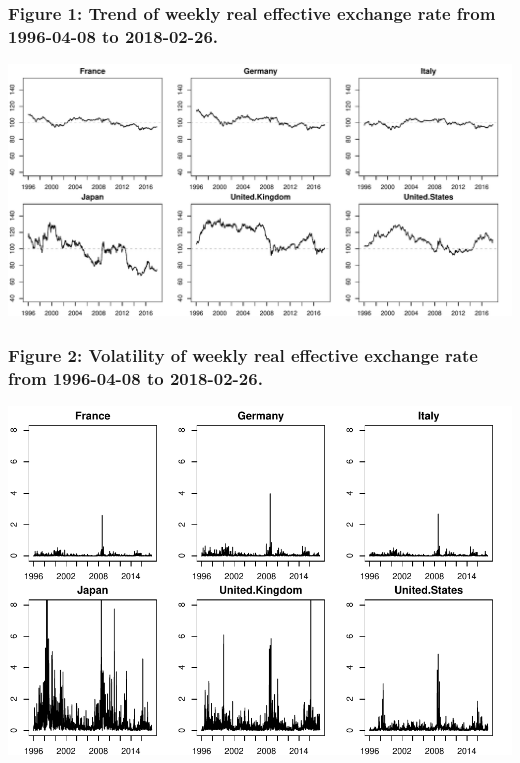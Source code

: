 \documentclass[]{elsarticle} %
\makeatletter
\def\maxwidth{\ifdim\Gin@nat@width>\linewidth\linewidth
\else\Gin@nat@width\fi}
\let\Oldincludegraphics\includegraphics
\renewcommand{\includegraphics}[1]{\Oldincludegraphics[width=\maxwidth]{#1}}
\makeatother
\begin{document}
\subsubsection{\texorpdfstring{\textbf{Figure 1: Trend of weekly real
effective exchange rate from 1996-04-08 to
2018-02-26.}}{Figure 1: Trend of weekly real effective exchange rate from 1996-04-08 to 2018-02-26.}}\label{figure-1-trend-of-weekly-real-effective-exchange-rate-from-1996-04-08-to-2018-02-26.}

\includegraphics{Main_files/figure-latex/unnamed-chunk-4-1.pdf}

\subsubsection{\texorpdfstring{\textbf{Figure 2: Volatility of weekly
real effective exchange rate from 1996-04-08 to
2018-02-26.}}{Figure 2: Volatility of weekly real effective exchange rate from 1996-04-08 to 2018-02-26.}}\label{figure-2-volatility-of-weekly-real-effective-exchange-rate-from-1996-04-08-to-2018-02-26.}

\includegraphics{Main_files/figure-latex/unnamed-chunk-5-1.pdf}
\end{document}
